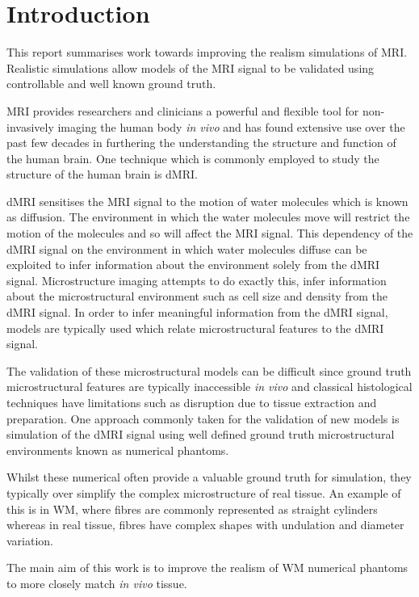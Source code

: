 \chapter{Introduction}
\label{sec:introduction}

This report summarises work towards improving the realism simulations of \ac{MRI}. Realistic simulations allow models of the MRI signal to be validated using controllable and well known ground truth. 

\ac{MRI} provides researchers and clinicians a powerful and flexible tool for non-invasively imaging the human body \emph{in vivo} and has found extensive use over the past few decades in furthering the understanding the structure and function of the human brain.
One technique which is commonly employed to study the structure of the human brain is \ac{dMRI}.

\ac{dMRI} sensitises the \ac{MRI} signal to the motion of water molecules which is known as diffusion.
The environment in which the water molecules move will restrict the motion of the molecules and so will affect the \ac{MRI} signal. 
This dependency of the \ac{dMRI} signal on the environment in which water molecules diffuse can be exploited to infer information about the environment solely from the \ac{dMRI} signal.  
Microstructure imaging attempts to do exactly this, infer information about the microstructural environment such as cell size and density from the \ac{dMRI} signal.
In order to infer meaningful information from the \ac{dMRI} signal, models are typically used which relate microstructural features to the \ac{dMRI} signal.

The validation of these microstructural models can be difficult since ground truth microstructural features are typically inaccessible \emph{in vivo} and classical histological techniques have limitations such as disruption due to tissue extraction and preparation. 
One approach commonly taken for the validation of new models is simulation of the \ac{dMRI} signal using well defined ground truth microstructural environments known as numerical phantoms. 

Whilst these numerical often provide a valuable ground truth for simulation, they typically over simplify the complex microstructure of real tissue.
An example of this is in \ac{WM}, where fibres are commonly represented as straight cylinders whereas in real tissue, fibres have complex shapes with undulation and diameter variation.

The main aim of this work is to improve the realism of \ac{WM} numerical phantoms to more closely match \emph{in vivo} tissue.

